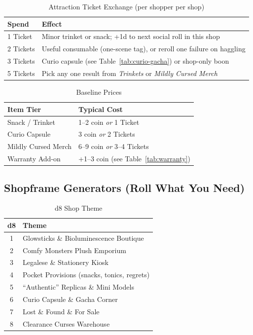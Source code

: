 \begin{table}[h]
\centering
\caption{Attraction Ticket Exchange (per shopper per shop)}
\label{tab:ticket-exchange}
\begin{tabular}{@{}ll@{}}
\toprule
\textbf{Spend} & \textbf{Effect} \\
\midrule
1 Ticket & Minor trinket or snack; +1d to next social roll in this shop \\
2 Tickets & Useful consumable (one-scene tag), or reroll one failure on haggling \\
3 Tickets & Curio capsule (see Table~\ref{tab:curio-gacha}) or shop-only boon \\
5 Tickets & Pick any one result from \emph{Trinkets} or \emph{Mildly Cursed Merch} \\
\bottomrule
\end{tabular}
\end{table}

\begin{table}[h]
\centering
\caption{Baseline Prices}
\label{tab:baseline-prices}
\begin{tabular}{@{}ll@{}}
\toprule
\textbf{Item Tier} & \textbf{Typical Cost} \\
\midrule
Snack / Trinket & 1--2 coin \emph{or} 1 Ticket \\
Curio Capsule & 3 coin \emph{or} 2 Tickets \\
Mildly Cursed Merch & 6--9 coin \emph{or} 3--4 Tickets \\
Warranty Add-on & +1--3 coin (see Table~\ref{tab:warranty}) \\
\bottomrule
\end{tabular}
\end{table}

\subsection{Shopframe Generators (Roll What You Need)}

\begin{table}[h]
\centering
\caption{d8 Shop Theme}
\label{tab:shop-theme}
\begin{tabular}{@{}cl@{}}
\toprule
d8 & Theme \\
\midrule
1 & Glowsticks \& Bioluminescence Boutique \\
2 & Comfy Monsters Plush Emporium \\
3 & Legalese \& Stationery Kiosk \\
4 & Pocket Provisions (snacks, tonics, regrets) \\
5 & ``Authentic'' Replicas \& Mini Models \\
6 & Curio Capsule \& Gacha Corner \\
7 & Lost \& Found \& For Sale \\
8 & Clearance Curses Warehouse \\
\bottomrule
\end{tabular}
\end{table}

